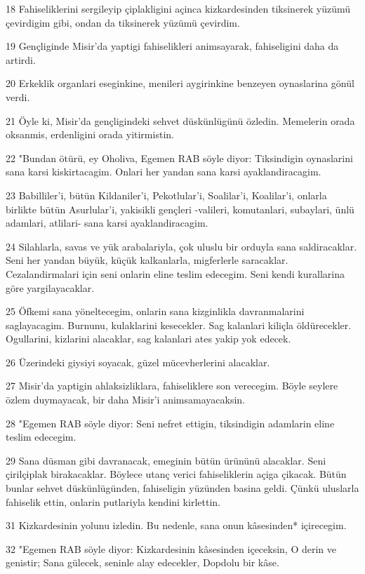 \par 18 Fahiseliklerini sergileyip çiplakligini açinca kizkardesinden tiksinerek yüzümü çevirdigim gibi, ondan da tiksinerek yüzümü çevirdim.
\par 19 Gençliginde Misir'da yaptigi fahiselikleri animsayarak, fahiseligini daha da artirdi.
\par 20 Erkeklik organlari eseginkine, menileri aygirinkine benzeyen oynaslarina gönül verdi.
\par 21 Öyle ki, Misir'da gençligindeki sehvet düskünlügünü özledin. Memelerin orada oksanmis, erdenligini orada yitirmistin.
\par 22 "Bundan ötürü, ey Oholiva, Egemen RAB söyle diyor: Tiksindigin oynaslarini sana karsi kiskirtacagim. Onlari her yandan sana karsi ayaklandiracagim.
\par 23 Babilliler'i, bütün Kildaniler'i, Pekotlular'i, Soalilar'i, Koalilar'i, onlarla birlikte bütün Asurlular'i, yakisikli gençleri -valileri, komutanlari, subaylari, ünlü adamlari, atlilari- sana karsi ayaklandiracagim.
\par 24 Silahlarla, savas ve yük arabalariyla, çok uluslu bir orduyla sana saldiracaklar. Seni her yandan büyük, küçük kalkanlarla, migferlerle saracaklar. Cezalandirmalari için seni onlarin eline teslim edecegim. Seni kendi kurallarina göre yargilayacaklar.
\par 25 Öfkemi sana yöneltecegim, onlarin sana kizginlikla davranmalarini saglayacagim. Burnunu, kulaklarini kesecekler. Sag kalanlari kiliçla öldürecekler. Ogullarini, kizlarini alacaklar, sag kalanlari ates yakip yok edecek.
\par 26 Üzerindeki giysiyi soyacak, güzel mücevherlerini alacaklar.
\par 27 Misir'da yaptigin ahlaksizliklara, fahiseliklere son verecegim. Böyle seylere özlem duymayacak, bir daha Misir'i animsamayacaksin.
\par 28 "Egemen RAB söyle diyor: Seni nefret ettigin, tiksindigin adamlarin eline teslim edecegim.
\par 29 Sana düsman gibi davranacak, emeginin bütün ürününü alacaklar. Seni çirilçiplak birakacaklar. Böylece utanç verici fahiseliklerin açiga çikacak. Bütün bunlar sehvet düskünlügünden, fahiseligin yüzünden basina geldi. Çünkü uluslarla fahiselik ettin, onlarin putlariyla kendini kirlettin.
\par 31 Kizkardesinin yolunu izledin. Bu nedenle, sana onun kâsesinden* içirecegim.
\par 32 "Egemen RAB söyle diyor: Kizkardesinin kâsesinden içeceksin, O derin ve genistir; Sana gülecek, seninle alay edecekler, Dopdolu bir kâse.
